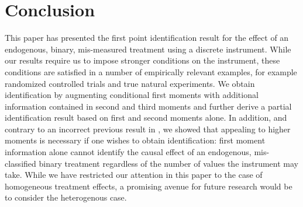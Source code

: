 \section{Conclusion}
This paper has presented the first point identification result for the effect of an endogenous, binary, mis-measured treatment using a discrete instrument.
While our results require us to impose stronger conditions on the instrument, these conditions are satisfied in a number of empirically relevant examples, for example randomized controlled trials and true natural experiments.
We obtain identification by augmenting conditional first moments with additional information contained in second and third moments and further derive a partial identification result based on first and second moments alone.
In addition, and contrary to an incorrect previous result in \cite{Mahajan}, we showed that appealing to higher moments is necessary if one wishes to obtain identification: first moment information alone cannot identify the causal effect of an endogenous, mis-classified binary treatment regardless of the number of values the instrument may take.
While we have restricted our attention in this paper to the case of homogeneous treatment effects, a promising avenue for future research would be to consider the heterogenous case.
